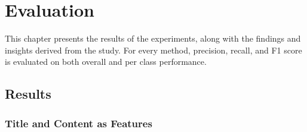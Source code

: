 \chapter{Evaluation}
\label{cha:5}


This chapter presents the results of the experiments, along with the findings and insights derived from the study. For every method, precision, recall, and F1 score is evaluated on both overall and per class performance.

\section{Results}

\subsection{Title and Content as Features}

